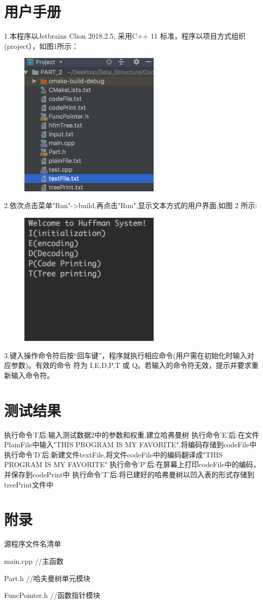 \documentclass[paper=a4,UTF8,fontsize=11pt]{scrartcl} %
\numberwithin{equation}{section} %
\numberwithin{figure}{section} %
\numberwithin{table}{section} %
\begin{document}
\section{用户手册}
1.本程序以Jetbrains Clion 2018.2.5, 采用C++ 11 标准，程序以项目方式组织(project），如图1所示：
\begin{figure}[h]
    \centering
    \includegraphics[width=0.6\textwidth]{project.png}
\end{figure}
\newpage
2.依次点击菜单"Run"->build,再点击"Run",显示文本方式的用户界面,如图 2 所示:
\begin{figure}[h]
    \centering
    \includegraphics[width=0.6\textwidth]{interface.png}
\end{figure}

3.键入操作命令符后按“回车键”，程序就执行相应命令(用户需在初始化时输入对应参数)。有效的命令
符为 I,E,D,P,T 或 Q。若输入的命令符无效，提示并要求重新输入命令符。

\section{测试结果}
执行命令'I'后:输入测试数据2中的参数和权重,建立哈弗曼树
执行命令'E'后:在文件PlainFile中输入"THIS PROGRAM IS MY FAVORITE",将编码存储到codeFile中
执行命令'D'后:新建文件textFile,将文件codeFile中的编码翻译成"THIS PROGRAM IS MY FAVORITE"
执行命令'P'后:在屏幕上打印codeFile中的编码，并保存到codePrint中
执行命令'T'后:将已建好的哈弗曼树以凹入表的形式存储到treePrint文件中

\section{附录}

源程序文件名清单

main.cpp                //主函数

Part.h                  //哈夫曼树单元模块

FuncPointer.h           //函数指针模块
\end{document}
